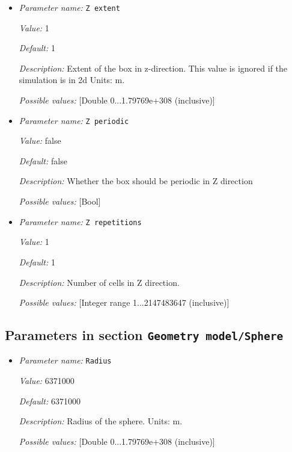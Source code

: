 \begin{itemize}
{\it Default:} 1


{\it Description:} Number of cells in Y direction.


{\it Possible values:} [Integer range 1...2147483647 (inclusive)]
\item {\it Parameter name:} {\tt Z extent}


{\it Value:} 1


{\it Default:} 1


{\it Description:} Extent of the box in z-direction. This value is ignored if the simulation is in 2d Units: m.


{\it Possible values:} [Double 0...1.79769e+308 (inclusive)]
\item {\it Parameter name:} {\tt Z periodic}


{\it Value:} false


{\it Default:} false


{\it Description:} Whether the box should be periodic in Z direction


{\it Possible values:} [Bool]
\item {\it Parameter name:} {\tt Z repetitions}


{\it Value:} 1


{\it Default:} 1


{\it Description:} Number of cells in Z direction.


{\it Possible values:} [Integer range 1...2147483647 (inclusive)]
\end{itemize}

\subsection{Parameters in section \tt Geometry model/Sphere}
\label{parameters:Geometry_20model/Sphere}

\begin{itemize}
\item {\it Parameter name:} {\tt Radius}


{\it Value:} 6371000


{\it Default:} 6371000


{\it Description:} Radius of the sphere. Units: m.


{\it Possible values:} [Double 0...1.79769e+308 (inclusive)]
\end{itemize}

